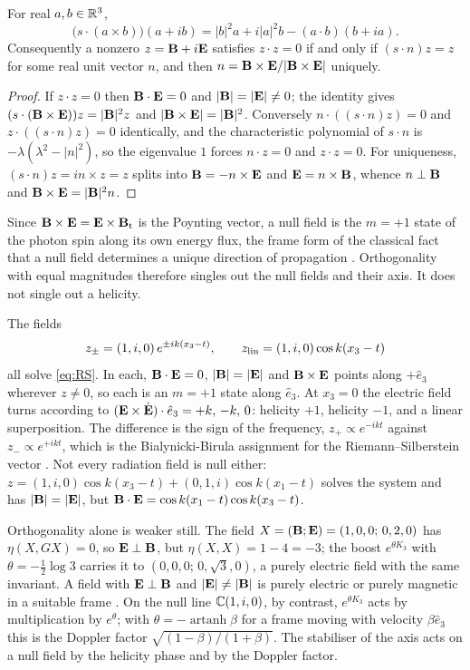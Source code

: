 \begin{theorem}
\label{thm:axis}
For real $a,b\in\mathbb{R}^3$,
\[
\bigl(s\cdot(a\times b)\bigr)(a+ib)=|b|^2a+i|a|^2b-(a\cdot b)(b+ia).
\]
Consequently a nonzero $z=\mathbf B+i\mathbf E$ satisfies $z\cdot z=0$ if and only if $(s\cdot n)z=z$ for some real unit vector $n$, and then
$n=\mathbf B\times\mathbf E/|\mathbf B\times\mathbf E|$ uniquely.
\end{theorem}

\begin{proof}
If $z\cdot z=0$ then $\mathbf B\cdot\mathbf E=0$ and $|\mathbf B|=|\mathbf E|\neq0$; the identity gives $(s\cdot(\mathbf B\times\mathbf E))z=|\mathbf B|^2z$ and
$|\mathbf B\times\mathbf E|=|\mathbf B|^2$. Conversely $n\cdot((s\cdot n)z)=0$ and $z\cdot((s\cdot n)z)=0$ identically, and the characteristic polynomial
of $s\cdot n$ is $-\lambda(\lambda^2-|n|^2)$, so the eigenvalue $1$ forces $n\cdot z=0$ and $z\cdot z=0$. For uniqueness,
$(s\cdot n)z=in\times z=z$ splits into $\mathbf B=-n\times\mathbf E$ and $\mathbf E=n\times\mathbf B$, whence $n\perp\mathbf B$ and $\mathbf B\times\mathbf E=|\mathbf B|^2n$.
\end{proof}

Since $\mathbf B\times\mathbf E=\mathbf E\times\mathbf B_{\rm t}$ is the Poynting vector, a null field is the $m=+1$ state of the photon spin along its own energy
flux, the frame form of the classical fact that a null field determines a unique direction of propagation
\cite{Synge56,Robinson61}. Orthogonality with equal magnitudes therefore singles out the null fields and their axis. It does not
single out a helicity.

\begin{example}
\label{ex:threewaves}
The fields
\[
z_\pm=(1,i,0)\,e^{\pm ik(x_3-t)},\qquad z_{\rm lin}=(1,i,0)\cos k(x_3-t)
\]
all solve \eqref{eq:RS}. In each, $\mathbf B\cdot\mathbf E=0$, $|\mathbf B|=|\mathbf E|$ and $\mathbf B\times\mathbf E$ points along $+\hat e_3$ wherever $z\neq0$, so each is an
$m=+1$ state along $\hat e_3$. At $x_3=0$ the electric field turns according to $(\mathbf E\times\dot{\mathbf E})\cdot\hat e_3=+k,\,-k,\,0$: helicity
$+1$, helicity $-1$, and a linear superposition. The difference is the sign of the frequency, $z_+\propto e^{-ikt}$ against
$z_-\propto e^{+ikt}$, which is the Bialynicki-Birula assignment for the Riemann--Silberstein vector \cite{BialynickiBirula96}. Not every
radiation field is null either: $z=(1,i,0)\cos k(x_3-t)+(0,1,i)\cos k(x_1-t)$ solves the system and has $|\mathbf B|=|\mathbf E|$, but
$\mathbf B\cdot\mathbf E=\cos k(x_1-t)\cos k(x_3-t)$.
\end{example}

Orthogonality alone is weaker still. The field $X=(\mathbf B;\mathbf E)=(1,0,0;\,0,2,0)$ has $\eta(X,GX)=0$, so $\mathbf E\perp\mathbf B$, but
$\eta(X,X)=1-4=-3$; the boost $e^{\theta K_3}$ with $\theta=-\tfrac12\log3$ carries it to $(0,0,0;\,0,\sqrt3,0)$, a purely electric field
with the same invariant. A field with $\mathbf E\perp\mathbf B$ and $|\mathbf E|\neq|\mathbf B|$ is purely electric or purely magnetic in a suitable frame
\cite{LandauLifshitz2}. On the null line $\mathbb{C}(1,i,0)$, by contrast, $e^{\theta K_3}$ acts by multiplication by $e^\theta$; with
$\theta=-\operatorname{artanh}\beta$ for a frame moving with velocity $\beta\hat e_3$ this is the Doppler factor $\sqrt{(1-\beta)/(1+\beta)}$.
The stabiliser of the axis acts on a null field by the helicity phase and by the Doppler factor.

